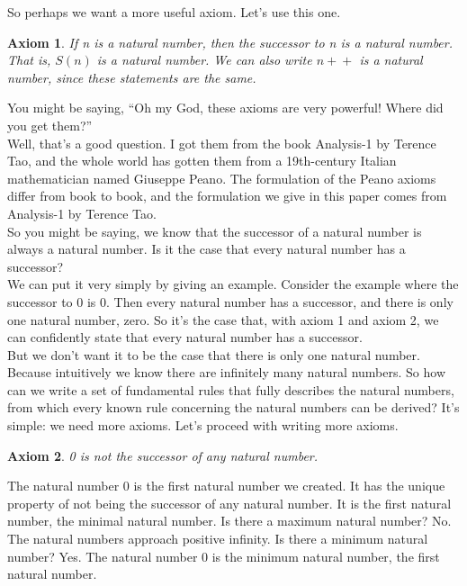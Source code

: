 \documentclass{article}
\newtheorem{axiom}{Axiom}
\newcommand{\inc}[1]{\mathrel{{{#1}+}+}}
\begin{document}
So perhaps we want a more useful axiom. Let's use this one. 

\begin{axiom}
If n is a natural number, then the successor to n is a natural number. That is, $S(n)$ is a natural number. We can also write $\inc{n}$ is a natural number, since these statements are the same.
\end{axiom}

You might be saying, ``Oh my God, these axioms are very powerful! Where did you get them?'' \\

Well, that's a good question. I got them from the book Analysis-1 by Terence Tao, and the whole world has gotten them from a 19th-century Italian mathematician named Giuseppe Peano. The formulation of the Peano axioms differ from book to book, and the formulation we give in this paper comes from Analysis-1 by Terence Tao. \\

So you might be saying, we know that the successor of a natural number is always a natural number. Is it the case that every natural number has a successor? \\

We can put it very simply by giving an example. Consider the example where the successor to 0 is 0. Then every natural number has a successor, and there is only one natural number, zero. So it's the case that, with axiom 1 and axiom 2, we can confidently state that every natural number has a successor. \\

But we don't want it to be the case that there is only one natural number. Because intuitively we know there are infinitely many natural numbers. So how can we write a set of fundamental rules that fully describes the natural numbers, from which every known rule concerning the natural numbers can be derived? It's simple: we need more axioms. Let's proceed with writing more axioms.

\begin{axiom}
0 is not the successor of any natural number.
\end{axiom}

The natural number 0 is the first natural number we created. It has the unique property of not being the successor of any natural number. It is the first natural number, the minimal natural number. Is there a maximum natural number? No. The natural numbers approach positive infinity. Is there a minimum natural number? Yes. The natural number 0 is the minimum natural number, the first natural number. \\
\end{document}
